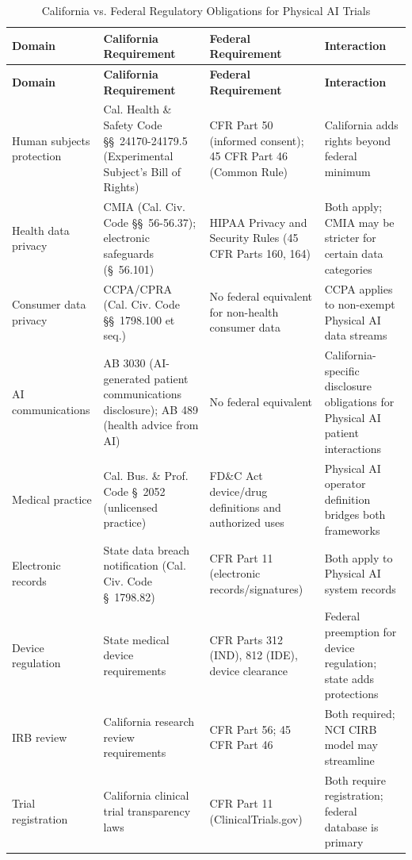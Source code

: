 \begin{longtable}{
    >{\raggedright\arraybackslash}p{2.95cm} 
    >{\raggedright\arraybackslash}p{4.8cm} 
    >{\raggedright\arraybackslash}p{4.5cm} 
    >{\raggedright\arraybackslash}p{2.95cm}
}
\caption{California vs. Federal Regulatory Obligations for Physical AI Trials}
\label{tab:comparative-obligations} \\ 
\toprule 
\textbf{Domain} & \textbf{California Requirement} & \textbf{Federal Requirement} & \textbf{Interaction} \\
\midrule
\endfirsthead
\toprule
\textbf{Domain} & \textbf{California Requirement} & \textbf{Federal Requirement} & \textbf{Interaction} \\
\midrule
\endhead
\bottomrule
\endfoot 
Human subjects protection & Cal. Health \& Safety Code \S\S~24170-24179.5 (Experimental Subject's Bill of Rights) & 21 CFR Part 50 (informed consent); 45 CFR Part 46 (Common Rule) & California adds rights beyond federal minimum \\ 
Health data privacy & CMIA (Cal. Civ. Code \S\S~56-56.37); electronic safeguards (\S~56.101) & HIPAA Privacy and Security Rules (45 CFR Parts 160, 164) & Both apply; CMIA may be stricter for certain data categories \\
Consumer data privacy & CCPA/CPRA (Cal. Civ. Code \S\S~1798.100 et seq.) & No federal equivalent for non-health consumer data & CCPA applies to non-exempt Physical AI data streams \\
AI communications & AB 3030 (AI-generated patient communications disclosure); AB 489 (health advice from AI) & No federal equivalent & California-specific disclosure obligations for Physical AI patient interactions \\
Medical practice & Cal. Bus. \& Prof. Code \S~2052 (unlicensed practice) & FD\&C Act device/drug definitions and authorized uses & Physical AI operator definition bridges both frameworks \\
Electronic records & State data breach notification (Cal. Civ. Code \S~1798.82) & 21 CFR Part 11 (electronic records/signatures) & Both apply to Physical AI system records \\
Device regulation & State medical device requirements & 21 CFR Parts 312 (IND), 812 (IDE), device clearance & Federal preemption for device regulation; state adds protections \\
IRB review & California research review requirements & 21 CFR Part 56; 45 CFR Part 46 & Both required; NCI CIRB model may streamline \\
Trial registration & California clinical trial transparency laws & 42 CFR Part 11 (ClinicalTrials.gov) & Both require registration; federal database is primary \\
\end{longtable}

